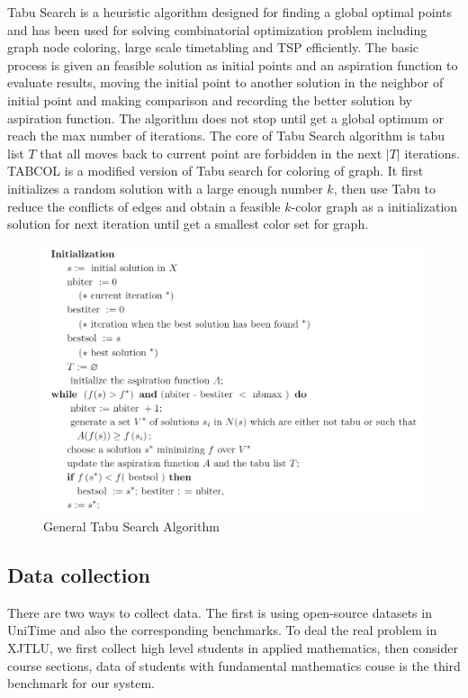\documentclass{article}
\begin{document}
Tabu Search is a heuristic algorithm designed for finding a global optimal points and has been used for solving combinatorial optimization problem including graph node coloring, large scale timetabling and TSP efficiently. The basic process is given an feasible solution as initial points and an aspiration function to evaluate results, moving the initial point to another solution in the neighbor of initial point and making comparison and recording the better solution by aspiration function. The algorithm does not stop until get a global optimum or reach the max number of iterations. The core of Tabu Search algorithm is tabu list $T$ that all moves back to current point are forbidden in the next $|T|$ iterations. TABCOL\citep{(hertz1987)using} is a modified version of Tabu search for coloring of graph. It first initializes a random solution with a large enough number $k$, then use Tabu to reduce the conflicts of edges and obtain a feasible $k$-color graph as a initialization solution for next iteration until get a smallest color set for graph.


\begin{figure}[h]
	\centering
	\includegraphics[width=0.8\linewidth]{fig3.png}
	\caption{General Tabu Search Algorithm \citep{(hertz1991)tabu}}
\end{figure}

\subsection{Data collection}

There are two ways to collect data. The first is using open-source datasets in UniTime and also the corresponding benchmarks. To deal the real problem in XJTLU, we first collect high level students in applied mathematics, then consider course sections, data of students with fundamental mathematics couse is the third benchmark for our system. 
\end{document}

